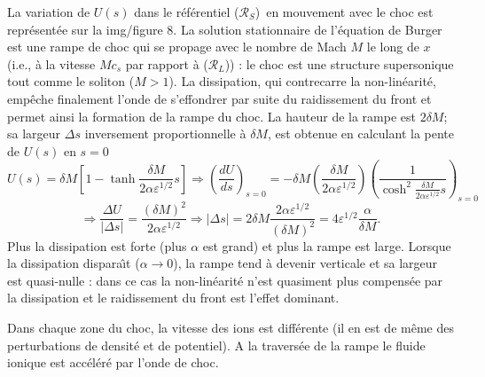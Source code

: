 \documentclass[10pt,thmsa]{article}
\begin{document}
La variation de $U(s)$ dans le r\'{e}f\'{e}rentiel ($\mathcal{R}_{S}$)\ en
mouvement avec le choc est repr\'{e}sent\'{e}e sur la img/figure 8$.$ La solution
stationnaire de l'\'{e}quation de Burger est une rampe de choc qui se propage
avec le nombre de Mach $M$ le long de $x$ (i.e., \`{a} la vitesse $Mc_{s}$ par
rapport \`{a} ($\mathcal{R}_{L}$)) : le choc est une structure supersonique
tout comme le soliton ($M>1$). La dissipation, qui contrecarre la
non-lin\'{e}arit\'{e}, emp\^{e}che finalement l'onde de s'effondrer par suite
du raidissement du front et permet ainsi la formation de la rampe du choc. La
hauteur de la rampe est $2\delta M$; sa largeur $\Delta s$ inversement
proportionnelle \`{a} $\delta M$, est obtenue en calculant la pente de $U(s)$
en $s=0$%
\begin{equation}
U(s)=\delta M\left[  1-\tanh\frac{\delta M}{2\alpha\varepsilon^{1/2}}s\right]
\Rightarrow\left(  \frac{dU}{ds}\right)  _{s=0}=-\delta M\left(  \frac{\delta
M}{2\alpha\varepsilon^{1/2}}\right)  \left(  \frac{1}{\cosh^{2}\frac{\delta
M}{2\alpha\varepsilon^{1/2}}s}\right)  _{s=0}\label{A112}%
\end{equation}%
\begin{equation}
\Rightarrow\frac{\Delta U}{\left\vert \Delta s\right\vert }=\frac{(\delta
M)^{2}}{2\alpha\varepsilon^{1/2}}\Rightarrow\left\vert \Delta s\right\vert
=2\delta M\frac{2\alpha\varepsilon^{1/2}}{(\delta M)^{2}}=4\varepsilon
^{1/2}\frac{\alpha}{\delta M}.\label{AA112}%
\end{equation}
Plus la dissipation est forte (plus $\alpha$ est grand) et plus la rampe est
large. Lorsque la dissipation dispara\^{\i}t ($\alpha\rightarrow0$), la rampe
tend \`{a} devenir verticale et sa largeur est quasi-nulle : dans ce cas la
non-lin\'{e}arit\'{e} n'est quasiment plus compens\'{e}e par la dissipation et
le raidissement du front est l'effet dominant.

Dans chaque zone du choc, la vitesse des ions est diff\'{e}rente (il en est de
m\^{e}me des perturbations de densit\'{e} et de potentiel). A la travers\'{e}e
de la rampe le fluide ionique est acc\'{e}l\'{e}r\'{e} par l'onde de choc.
\end{document}
